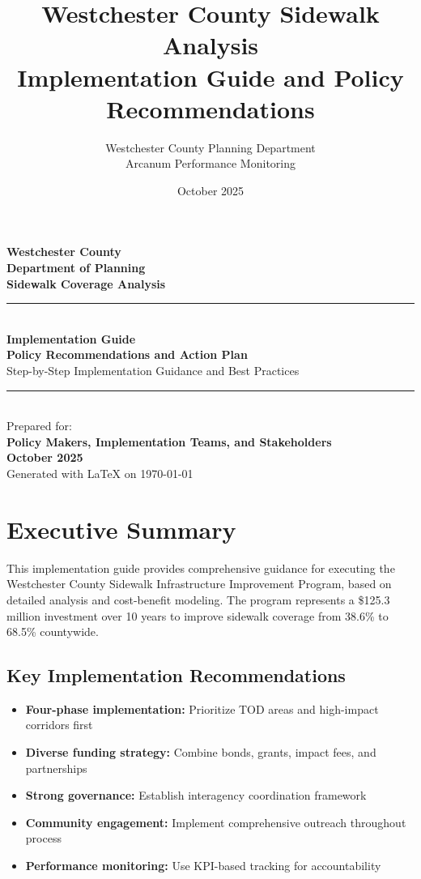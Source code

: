 \documentclass[11pt,letterpaper]{article}
\title{Westchester County Sidewalk Analysis\\
\large Implementation Guide and Policy Recommendations}
\author{Westchester County Planning Department\\
Arcanum Performance Monitoring}
\date{October 2025}
\begin{document}
\begin{titlepage}
    \centering
    \vspace*{2cm}

    {\Large\bfseries Westchester County}\\[0.5cm]
    {\large\bfseries Department of Planning}\\[0.5cm]
    {\large\bfseries Sidewalk Coverage Analysis}\\[1cm]

    \rule{\textwidth}{1.5pt}\\[0.5cm]
    {\huge\bfseries Implementation Guide}\\[0.3cm]
    {\Large\bfseries Policy Recommendations and Action Plan}\\[0.3cm]
    {\large Step-by-Step Implementation Guidance and Best Practices}\\[0.5cm]
    \rule{\textwidth}{1.5pt}\\[1cm]

    {\large Prepared for:}\\[0.3cm]
    {\large\bfseries Policy Makers, Implementation Teams, and Stakeholders}\\[1cm]

    {\large\bfseries October 2025}\\[1cm]

    \vfill
    {\small Generated with \LaTeX{} on \today}
\end{titlepage}

\tableofcontents
\newpage

\section{Executive Summary}

This implementation guide provides comprehensive guidance for executing the Westchester County Sidewalk Infrastructure Improvement Program, based on detailed analysis and cost-benefit modeling. The program represents a \$125.3 million investment over 10 years to improve sidewalk coverage from 38.6\% to 68.5\% countywide.

\subsection{Key Implementation Recommendations}

\begin{itemize}
    \item \textbf{Four-phase implementation:} Prioritize TOD areas and high-impact corridors first
    \item \textbf{Diverse funding strategy:} Combine bonds, grants, impact fees, and partnerships
    \item \textbf{Strong governance:} Establish interagency coordination framework
    \item \textbf{Community engagement:} Implement comprehensive outreach throughout process
    \item \textbf{Performance monitoring:} Use KPI-based tracking for accountability
\end{itemize}
\end{document}
